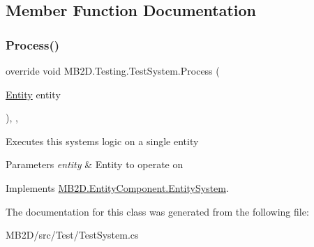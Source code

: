 \subsection{Member Function Documentation}
\hypertarget{class_m_b2_d_1_1_testing_1_1_test_system_a35d160e6e7e8ffb8f1a6cf403b00ef40}{}\label{class_m_b2_d_1_1_testing_1_1_test_system_a35d160e6e7e8ffb8f1a6cf403b00ef40} 
\subsubsection{\texorpdfstring{Process()}{Process()}}
{\footnotesize\ttfamily override void M\+B2\+D.\+Testing.\+Test\+System.\+Process (\begin{DoxyParamCaption}\item[{\hyperlink{class_m_b2_d_1_1_entity_component_1_1_entity}{Entity}}]{entity }\end{DoxyParamCaption})\hspace{0.3cm}{\ttfamily [inline]}, {\ttfamily [protected]}, {\ttfamily [virtual]}}



Executes this systems logic on a single entity 


\begin{DoxyParams}{Parameters}
{\em entity} & Entity to operate on\\
\hline
\end{DoxyParams}


Implements \hyperlink{class_m_b2_d_1_1_entity_component_1_1_entity_system_abbf83b87cb5d12754fb058cef50451fa}{M\+B2\+D.\+Entity\+Component.\+Entity\+System}.



The documentation for this class was generated from the following file\+:\begin{DoxyCompactItemize}
\item 
M\+B2\+D/src/\+Test/Test\+System.\+cs\end{DoxyCompactItemize}
